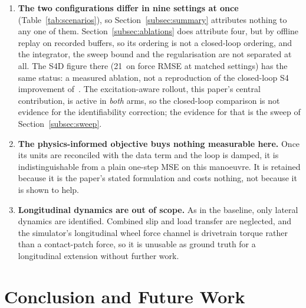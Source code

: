 \documentclass[lineno,12pt]{sn-jnl}
\makeatletter
\newif\ifsiu@prev
\DeclareRobustCommand{\siu@sep}{\ifsiu@prev\,\fi}
\DeclareRobustCommand{\siu@unit}[1]{\siu@sep\text{#1}\siu@prevtrue}
\DeclareRobustCommand{\siu@pre}[1]{\siu@sep\text{#1}\siu@prevfalse}
\DeclareRobustCommand{\siu@div}[1]{\text{#1}\siu@prevfalse}
\DeclareRobustCommand{\meter}{m}
\DeclareRobustCommand{\second}{s}
\DeclareRobustCommand{\gram}{g}
\DeclareRobustCommand{\newton}{N}
\DeclareRobustCommand{\radian}{rad}
\DeclareRobustCommand{\hertz}{Hz}
\DeclareRobustCommand{\percent}{\%}
\DeclareRobustCommand{\g}{\textit{g}}
\DeclareRobustCommand{\kilo}{k}
\DeclareRobustCommand{\milli}{m}
\DeclareRobustCommand{\per}{/}
\DeclareRobustCommand{\squared}{\ensuremath{^{2}}}
\providecommand{\degree}{\ensuremath{^{\circ}}}
\DeclareRobustCommand{\si}[1]{\begingroup
  \siu@prevfalse
  \renewcommand{\meter}{\siu@unit{m}}%
  \renewcommand{\second}{\siu@unit{s}}%
  \renewcommand{\gram}{\siu@unit{g}}%
  \renewcommand{\newton}{\siu@unit{N}}%
  \renewcommand{\radian}{\siu@unit{rad}}%
  \renewcommand{\hertz}{\siu@unit{Hz}}%
  \renewcommand{\percent}{\siu@unit{\%}}%
  \renewcommand{\degree}{\siu@unit{\ensuremath{^{\circ}}}}%
  \renewcommand{\g}{\siu@unit{\textit{g}}}%
  \renewcommand{\kilo}{\siu@pre{k}}%
  \renewcommand{\milli}{\siu@pre{m}}%
  \renewcommand{\per}{\siu@div{/}}%
  \renewcommand{\squared}{\ensuremath{^{2}}}%
  #1\endgroup}
\DeclareRobustCommand{\SI}[2]{#1\,\si{#2}}
\theoremstyle{thmstyleone}%
\theoremstyle{thmstyletwo}%
\theoremstyle{thmstylethree}%
\makeatother
\begin{document}
\begin{enumerate}
quasi-steady argument making $\mu_{f}=\mu_{r}$ holds on a homogeneous surface
and would not survive a split-$\mu$ one, which this sensor set cannot detect in
the first place.
\item \textbf{The two configurations differ in nine settings at once}
(Table~\ref{tab:scenarios}), so Section~\ref{subsec:summary} attributes nothing
to any one of them. Section~\ref{subsec:ablations} does attribute four, but by
offline replay on recorded buffers, so its ordering is not a closed-loop
ordering, and the integrator, the sweep bound and the regularisation are not
separated at all. The S4D figure there (\SI{21}{\percent} on force RMSE at
matched settings) has the same status: a measured ablation, not a reproduction
of the closed-loop S4 improvement of~\cite{visionsysid2026}. The
excitation-aware rollout, this paper's central contribution, is active in
\emph{both} arms, so the closed-loop comparison is not evidence for the
identifiability correction; the evidence for that is the sweep of
Section~\ref{subsec:sweep}.
\item \textbf{The physics-informed objective buys nothing measurable here.}
Once its units are reconciled with the data term and the loop is damped, it is
indistinguishable from a plain one-step MSE on this manoeuvre. It is retained
because it is the paper's stated formulation and costs nothing, not because it
is shown to help.
\item \textbf{Longitudinal dynamics are out of scope.} As in the baseline, only
lateral dynamics are identified. Combined slip and load transfer are neglected,
and the simulator's longitudinal wheel force channel is drivetrain torque rather
than a contact-patch force, so it is unusable as ground truth for a longitudinal
extension without further work.
\end{enumerate}

\section{Conclusion and Future Work}
\label{sec:conclusion}
\end{document}
